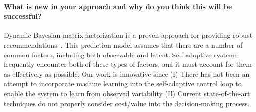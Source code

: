 \documentclass[12pt]{article}
\begin{document}





\vspace{-5mm}\paragraph{What is new in your approach and why do you think this will be successful?}

Dynamic Bayesian matrix factorization is a proven approach for providing robust recommendations~\cite{sun2012dynamic}. This prediction model assumes that there are a number of common factors, including both observable and latent. Self-adaptive systems frequently encounter both of these types of factors, and it must account for them as effectively as possible. Our work is innovative since (I) There has not been an attempt to incorporate machine learning into the self-adaptive control loop to enable the system to learn from observed variability (II) Current state-of-the-art techniques do not properly consider cost/value into the decision-making process.
\end{document}
